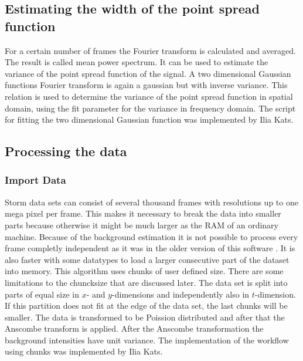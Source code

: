\subsection{Estimating the width of the point spread function}
For a certain number of frames the Fourier transform is calculated and averaged. The result is called mean power spectrum. It can be used to estimate the variance of the point spread function of the signal. A two dimensional Gaussian functions Fourier transform is again a gaussian but with inverse variance. This relation is used to determine the variance of the point spread function in spatial domain, using the fit parameter for the variance in frequency domain.\newline
The script for fitting the two dimensional Gaussian function was implemented by Ilia Kats.
\subsection{Processing the data}
\subsubsection{Import Data}
Storm data sets can consist of several thousand frames with resolutions up to one mega pixel per frame. This makes it necessary to break the data into smaller parts because otherwise it might be much larger as the RAM of an ordinary machine. Because of the background estimation it is not possible to process every frame completly independent as it was in the older version of this software \cite{MAJoachim}. It is also faster with some datatypes to load a larger consecutive part of the dataset into memory.\newline
This algorithm uses chunks of user defined size. There are some limitations to the chuncksize that are discussed later. The data set is split into parts of equal size in $x$- and $y$-dimensions and independently also in $t$-dimension. If this partition does not fit at the edge of the data set, the last chunks will be smaller.\newline
The data is transformed to be Poission distributed and after that the Anscombe transform is applied. After the Anscombe transformation the background intensities have unit variance.\newline
The implementation of the workflow using chunks was implemented by Ilia Kats.
